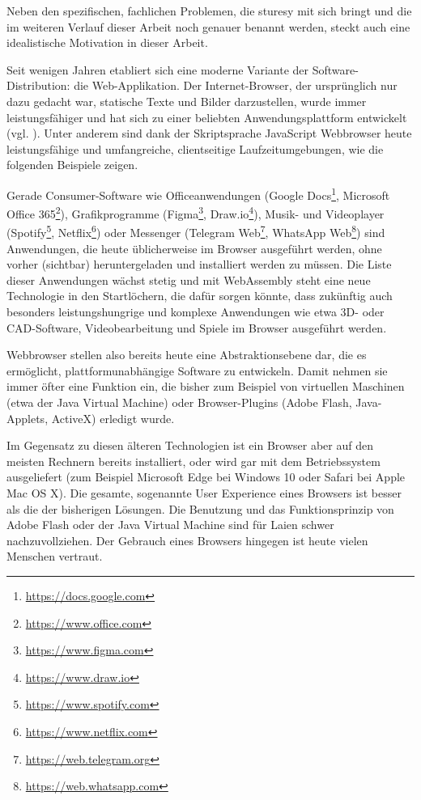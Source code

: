 Neben den spezifischen, fachlichen Problemen, die \ac{sturesy} mit sich bringt und die im weiteren Verlauf dieser Arbeit noch genauer benannt werden, steckt auch eine idealistische Motivation in dieser Arbeit.

Seit wenigen Jahren etabliert sich eine moderne Variante der Software-Distribution: die Web-Applikation. Der Internet-Browser, der ursprünglich nur dazu gedacht war, statische Texte und Bilder darzustellen, wurde immer leistungsfähiger und hat sich zu einer beliebten Anwendungsplattform entwickelt (vgl. \cite[S. 1]{art:web1to4}). Unter anderem sind dank der Skriptsprache JavaScript Webbrowser heute leistungsfähige und umfangreiche, clientseitige Laufzeitumgebungen, wie die folgenden Beispiele zeigen.

Gerade Consumer-Software wie Officeanwendungen (Google Docs\footnote{\url{https://docs.google.com}}, Microsoft Office 365\footnote{\url{https://www.office.com}}), Grafikprogramme (Figma\footnote{\url{https://www.figma.com}}, Draw.io\footnote{\url{https://www.draw.io}}), Musik- und Videoplayer (Spotify\footnote{\url{https://www.spotify.com}}, Netflix\footnote{\url{https://www.netflix.com}}) oder Messenger (Telegram Web\footnote{\url{https://web.telegram.org}}, WhatsApp Web\footnote{\url{https://web.whatsapp.com}}) sind Anwendungen, die heute üblicherweise im Browser ausgeführt werden, ohne vorher (sichtbar) heruntergeladen und installiert werden zu müssen. Die Liste dieser Anwendungen wächst stetig und mit WebAssembly steht eine neue Technologie in den Startlöchern, die dafür sorgen könnte, dass zukünftig auch besonders leistungshungrige und komplexe Anwendungen wie etwa 3D- oder CAD-Software, Videobearbeitung und Spiele im Browser ausgeführt werden.

Webbrowser stellen also bereits heute eine Abstraktionsebene dar, die es ermöglicht, plattformunabhängige Software zu entwickeln. Damit nehmen sie immer öfter eine Funktion ein, die bisher zum Beispiel von virtuellen Maschinen (etwa der Java Virtual Machine) oder Browser-Plugins (Adobe Flash, Java-Applets, ActiveX) erledigt wurde.

Im Gegensatz zu diesen älteren Technologien ist ein Browser aber auf den meisten Rechnern bereits installiert, oder wird gar mit dem Betriebssystem ausgeliefert (zum Beispiel Microsoft Edge bei Windows 10 oder Safari bei Apple Mac OS X). Die gesamte, sogenannte User Experience eines Browsers ist besser als die der bisherigen Lösungen.
Die Benutzung und das Funktionsprinzip von Adobe Flash oder der Java Virtual Machine sind für Laien schwer nachzuvollziehen. Der Gebrauch eines Browsers hingegen ist heute vielen Menschen vertraut.

